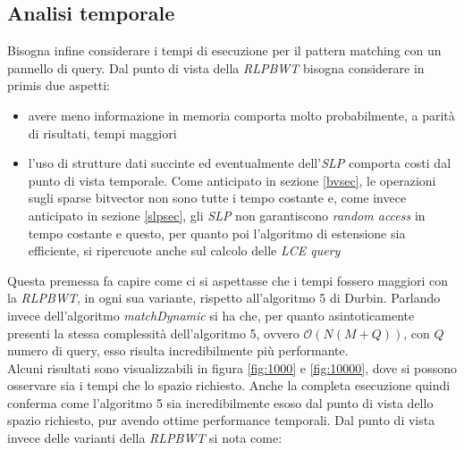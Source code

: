 \subsection{Analisi temporale}
Bisogna infine considerare i tempi di esecuzione per il pattern matching con un
pannello di query. Dal punto di vista della \textit{RLPBWT} bisogna considerare
in primis due aspetti:
\begin{itemize}
  \item avere meno informazione in memoria comporta molto probabilmente, a
  parità di risultati, tempi maggiori
  \item l'uso di strutture dati succinte ed eventualmente dell'\textit{SLP}
  comporta costi dal punto di vista temporale. Come anticipato in sezione
  \ref{bvsec}, le operazioni sugli sparse bitvector non sono tutte i tempo
  costante e, come invece anticipato in sezione \ref{slpsec}, gli \textit{SLP}
  non garantiscono \textit{random access} in tempo costante e questo, per quanto
  poi l'algoritmo di estensione sia efficiente, si ripercuote anche sul calcolo
  delle \textit{LCE query}
\end{itemize}
Questa premessa fa capire come ci si aspettasse che i tempi fossero maggiori con
la \textit{RLPBWT}, in ogni sua variante, rispetto all'algoritmo 5 di Durbin.
Parlando invece dell'algoritmo \textit{matchDynamic} si ha che, per quanto
asintoticamente presenti la stessa complessità dell'algoritmo 5, ovvero
$\mathcal{O}(N(M+Q))$, con $Q$ numero di query, esso risulta incredibilmente più
performante. \\
Alcuni risultati sono visualizzabili in figura \ref{fig:1000} e \ref{fig:10000},
dove si possono osservare sia i tempi che lo spazio richiesto. Anche la completa
esecuzione quindi conferma come l'algoritmo 5 sia incredibilmente esoso dal
punto di vista dello spazio richiesto, pur avendo ottime performance
temporali. Dal punto di vista invece delle varianti della \textit{RLPBWT} si
nota come:
